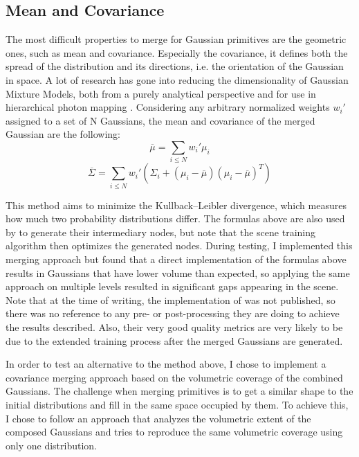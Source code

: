 \subsection{Mean and Covariance}
The most difficult properties to merge for Gaussian primitives are the geometric ones, such as mean and covariance. Especially the covariance, it defines both the spread of the distribution and its directions, i.e. the orientation of the Gaussian in space. A lot of research has gone into reducing the dimensionality of Gaussian Mixture Models, both from a purely analytical perspective \cite{gaussmerge2} and for use in hierarchical photon mapping \cite{gaussmerge1}. Considering any arbitrary normalized weights $w_i'$ assigned to a set of N Gaussians, the mean and covariance of the merged Gaussian are the following:
\[
\overline{\mu} = \sum_{i \leq N} w_i' \mu_i
\]
\[
\overline{\Sigma} = \sum_{i \leq N} w_i'(\Sigma_i + (\mu_i - \overline{\mu}) (\mu_i - \overline{\mu})^T) 
\]

This method aims to minimize the Kullback–Leibler divergence, which measures how much two probability distributions differ. The formulas above are also used by \cite{kerbl_hierarchy} to generate their intermediary nodes, but note that the scene training algorithm then optimizes the generated nodes. During testing, I implemented this merging approach but found that a direct implementation of the formulas above results in Gaussians that have lower volume than expected, so applying the same approach on multiple levels resulted in significant gaps appearing in the scene. Note that at the time of writing, the implementation of \cite{kerbl_hierarchy} was not published, so there was no reference to any pre- or post-processing they are doing to achieve the results described. Also, their very good quality metrics are very likely to be due to the extended training process after the merged Gaussians are generated.

In order to test an alternative to the method above, I chose to implement a covariance merging approach based on the volumetric coverage of the combined Gaussians. The challenge when merging primitives is to get a similar shape to the initial distributions and fill in the same space occupied by them. To achieve this, I chose to follow an approach that analyzes the volumetric extent of the composed Gaussians and tries to reproduce the same volumetric coverage using only one distribution. 

